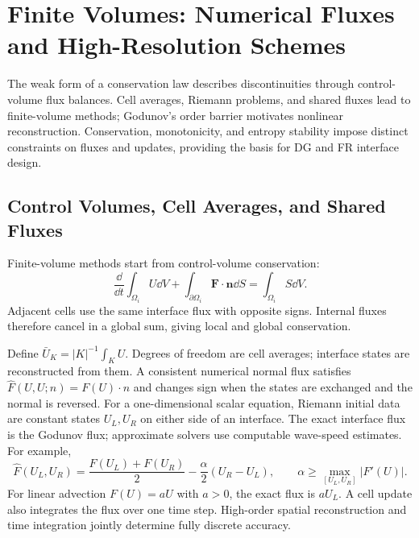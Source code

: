 \chapter{Finite Volumes: Numerical Fluxes and High-Resolution Schemes}\label{ch:8}
\begin{chaptersummary}
The weak form of a conservation law describes discontinuities through control-volume flux balances. Cell averages, Riemann problems, and shared fluxes lead to finite-volume methods; Godunov's order barrier motivates nonlinear reconstruction. Conservation, monotonicity, and entropy stability impose distinct constraints on fluxes and updates, providing the basis for DG and FR interface design.
\end{chaptersummary}
\section{Control Volumes, Cell Averages, and Shared Fluxes}
Finite-volume methods start from control-volume conservation:
\[
\frac{\dd}{\dd t}
\int_{\Omega_i}U\dd V
+
\int_{\partial\Omega_i}
\bm F\cdot\bm n\dd S
=
\int_{\Omega_i}S\dd V.
\]
Adjacent cells use the same interface flux with opposite signs. Internal fluxes therefore cancel in a global sum, giving local and global conservation.


Define $\bar U_K=|K|^{-1}\int_KU$. Degrees of freedom are cell averages; interface states are reconstructed from them.
A consistent numerical normal flux satisfies $\widehat F(U,U;n)=F(U)\cdot n$ and changes sign when the states are exchanged and the normal is reversed.
For a one-dimensional scalar equation, Riemann initial data are constant states $U_L,U_R$ on either side of an interface.
The exact interface flux is the Godunov flux; approximate solvers use computable wave-speed estimates.
For example,
\[
\widehat F(U_L,U_R)=\frac{F(U_L)+F(U_R)}2-\frac{\alpha}2(U_R-U_L),
\qquad
\alpha\ge\max_{[U_L,U_R]}|F'(U)|.
\]
For linear advection $F(U)=aU$ with $a>0$, the exact flux is $aU_L$.
A cell update also integrates the flux over one time step. High-order spatial reconstruction and time integration jointly determine fully discrete accuracy.

